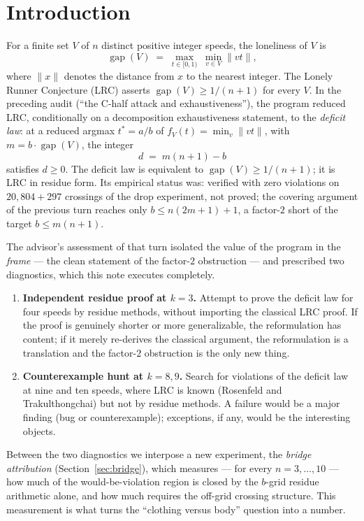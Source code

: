 \documentclass[11pt,a4paper]{article}
\theoremstyle{plain}
\theoremstyle{definition}
\theoremstyle{remark}
\newcommand{\norm}[1]{\lVert #1 \rVert}
\newcommand{\gap}{\operatorname{gap}}
\begin{document}
\tableofcontents
\newpage

\section{Introduction}\label{sec:intro}

For a finite set $V$ of $n$ distinct positive integer speeds, the loneliness of $V$ is
\[
  \gap(V) \;=\; \max_{t \in [0,1)} \; \min_{v \in V} \norm{v t},
\]
where $\norm{x}$ denotes the distance from $x$ to the nearest integer. The Lonely Runner
Conjecture (LRC) asserts $\gap(V) \ge 1/(n+1)$ for every $V$. In the preceding audit
(``the C-half attack and exhaustiveness''), the program reduced LRC, conditionally on a
decomposition exhaustiveness statement, to the \emph{deficit law}: at a reduced argmax
$t^{*} = a/b$ of $f_V(t) = \min_v \norm{v t}$, with $m = b \cdot \gap(V)$, the integer
\[
  d \;=\; m(n+1) - b
\]
satisfies $d \ge 0$. The deficit law is equivalent to $\gap(V) \ge 1/(n+1)$; it is LRC in
residue form. Its empirical status was: verified with zero violations on $20{,}804 + 297$
crossings of the drop experiment, not proved; the covering argument of the previous turn
reaches only $b \le n(2m+1)+1$, a factor-$2$ short of the target $b \le m(n+1)$.

The advisor's assessment of that turn isolated the value of the program in the
\emph{frame} --- the clean statement of the factor-$2$ obstruction --- and prescribed two
diagnostics, which this note executes completely.

\begin{enumerate}[label=\textbf{D\arabic*.}, leftmargin=*]
\item \textbf{Independent residue proof at $k = 3$.} Attempt to prove the deficit law for
four speeds by residue methods, without importing the classical LRC proof. If the proof
is genuinely shorter or more generalizable, the reformulation has content; if it merely
re-derives the classical argument, the reformulation is a translation and the factor-$2$
obstruction is the only new thing.
\item \textbf{Counterexample hunt at $k = 8, 9$.} Search for violations of the deficit
law at nine and ten speeds, where LRC is known (Rosenfeld and Trakulthongchai) but not by
residue methods. A failure would be a major finding (bug or counterexample); exceptions,
if any, would be the interesting objects.
\end{enumerate}

Between the two diagnostics we interpose a new experiment, the \emph{bridge attribution}
(Section~\ref{sec:bridge}), which measures --- for every $n = 3, \dots, 10$ --- how much
of the would-be-violation region is closed by the $b$-grid residue arithmetic alone, and
how much requires the off-grid crossing structure. This measurement is what turns the
``clothing versus body'' question into a number.
\end{document}

